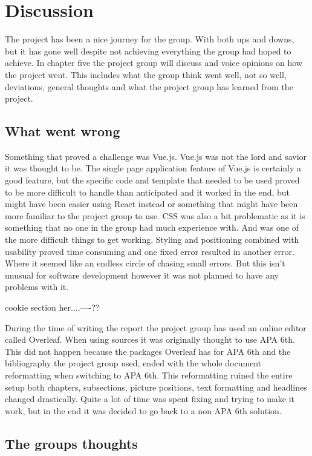 \chapter{Discussion}
The project has been a nice journey for the group. With both ups and downs, but it has gone well despite not achieving everything the group had hoped to achieve. In chapter five the project group will discuss and voice opinions on how the project went. This includes what the group think went well, not so well, deviations, general thoughts and what the project group has learned from the project.   
\section{What went wrong}
Something that proved a challenge was Vue.js. Vue.js was not the lord and savior it was thought to be. The single page application feature of Vue.js is certainly a good feature, but the specific code and template that needed to be used proved to be more difficult to handle than anticipated and it worked in the end, but might have been easier using React instead or something that might have been more familiar to the project group to use. CSS was  also a bit problematic as it is something that no one in the group had much experience with. And was one of the more difficult things to get working. Styling and positioning combined with usability proved time consuming and one fixed error resulted in another error. Where it seemed like an endless circle of chasing small errors. But this isn't unusual for software development however it was not planned to have any problems with it. 

cookie section her....----??

During the time of writing the report the project group has used an online editor called Overleaf. When using sources it was originally thought to use APA 6th. This did not happen because the packages Overleaf has for APA 6th and the bibliography the project group used, ended with the whole document reformatting when switching to APA 6th. This reformatting ruined the entire setup both chapters, subsections, picture positions, text formatting and headlines changed drastically. Quite a lot of time was spent fixing and trying to make it work, but in the end it was decided to go back to a non APA 6th solution.  
\section{The groups thoughts}

